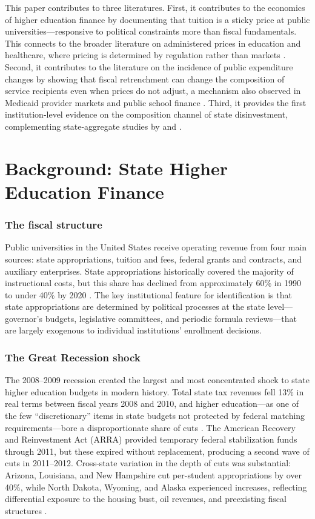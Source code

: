 \documentclass[12pt]{article}
\begin{document}
This paper contributes to three literatures. First, it contributes to the economics of higher education finance by documenting that tuition is a sticky price at public universities---responsive to political constraints more than fiscal fundamentals. This connects to the broader literature on administered prices in education and healthcare, where pricing is determined by regulation rather than markets \citep{rothstein2011constrained}. Second, it contributes to the literature on the incidence of public expenditure changes by showing that fiscal retrenchment can change the composition of service recipients even when prices do not adjust, a mechanism also observed in Medicaid provider markets \citep{duggan2000hospital} and public school finance \citep{jackson2016effects}. Third, it provides the first institution-level evidence on the composition channel of state disinvestment, complementing state-aggregate studies by \citet{bound2007cohort} and \citet{demingwalters2017}.

\section{Background: State Higher Education Finance}

\subsubsection*{The fiscal structure} Public universities in the United States receive operating revenue from four main sources: state appropriations, tuition and fees, federal grants and contracts, and auxiliary enterprises. State appropriations historically covered the majority of instructional costs, but this share has declined from approximately 60\% in 1990 to under 40\% by 2020 \citep{sheostateprofiles}. The key institutional feature for identification is that state appropriations are determined by political processes at the state level---governor's budgets, legislative committees, and periodic formula reviews---that are largely exogenous to individual institutions' enrollment decisions.

\subsubsection*{The Great Recession shock} The 2008--2009 recession created the largest and most concentrated shock to state higher education budgets in modern history. Total state tax revenues fell 13\% in real terms between fiscal years 2008 and 2010, and higher education---as one of the few ``discretionary'' items in state budgets not protected by federal matching requirements---bore a disproportionate share of cuts \citep{delaney2011state}. The American Recovery and Reinvestment Act (ARRA) provided temporary federal stabilization funds through 2011, but these expired without replacement, producing a second wave of cuts in 2011--2012. Cross-state variation in the depth of cuts was substantial: Arizona, Louisiana, and New Hampshire cut per-student appropriations by over 40\%, while North Dakota, Wyoming, and Alaska experienced increases, reflecting differential exposure to the housing bust, oil revenues, and preexisting fiscal structures \citep{mitchell2017deeper}.
\end{document}
